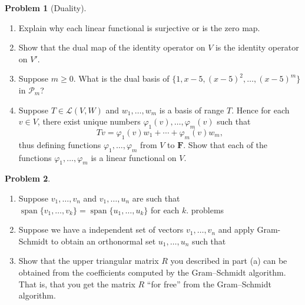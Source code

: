\documentclass[12pt]{article}
\theoremstyle{definition}
\newtheorem{problem}{Problem}
\begin{document}
\begin{problem}[Duality]~
\begin{enumerate}
    \item Explain why each linear functional is surjective or is the zero map.
    \item Show that the dual map of the identity operator on $V$ is the identity operator
    on $V'$.
    \item Suppose $m\geq 0$. What is the dual basis of $\{1,x-5,(x-5)^2, \ldots, (x-5)^m\}$ in $\mathcal{P}_m$?
    \item Suppose $T \in \mathcal{L}(V, W)$ and $w_1, \ldots, w_m$ is a basis of range $T$. Hence for each $v \in V$, there exist unique numbers $\varphi_1(v), \ldots, \varphi_m(v)$ such that
    $$
    T v=\varphi_1(v) w_1+\cdots+\varphi_m(v) w_m,
    $$
    thus defining functions $\varphi_1, \ldots, \varphi_m$ from $V$ to $\mathbf{F}$. Show that each of the functions $\varphi_1, \ldots, \varphi_m$ is a linear functional on $V$.
\end{enumerate}
\end{problem}

\clearpage
\begin{problem}~

    \begin{enumerate}
        \item  Suppose $v_1, \ldots, v_n$ and $v_1, \ldots, u_n$ are such that $\operatorname{span}\{v_1, \ldots, v_k\} = \operatorname{span}\{u_1, \ldots, u_k\}$ for each $k$.
        problems
        \item 
    Suppose we have a independent set of vectors $v_1, \ldots, v_n$ and apply Gram-Schmidt to obtain an orthonormal set $u_1, \ldots, u_n$ such that 

        \begin{center}
        \end{center}

        \item Show that the upper triangular matrix $R$ you described in part (a) can be obtained from the coefficients computed by the Gram--Schmidt algorithm. 
        That is, that you get the matrix $R$ ``for free'' from the Gram--Schmidt algorithm.

    \end{enumerate}
\end{problem}
\end{document}
